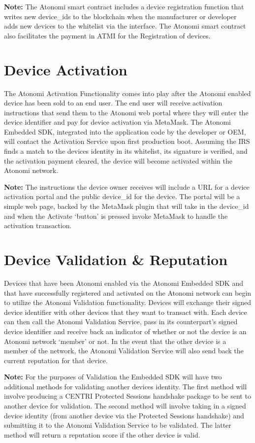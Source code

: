 \textbf{Note:} The Atonomi smart contract includes a device registration
function that writes
new device_ids to the blockchain when the manufacturer or developer adds new
devices to the whitelist via the interface. The Atonomi smart contract also
facilitates the payment in ATMI for the Registration of devices.


\section{Device Activation}
The Atonomi Activation Functionality comes into play after the Atonomi enabled
device has been sold to an end user. The end user will receive activation
instructions that send them to the Atonomi web portal where they will enter the
device identifier and pay for device activation via MetaMask. The Atonomi
Embedded SDK, integrated into the application code by the developer or OEM,
will contact the Activation Service upon first production boot. Assuming the
IRS finds a match to the devices identity in its whitelist, its signature is
verified, and the activation payment cleared, the device will become activated
within the Atonomi network.

\textbf{Note:} The instructions the device owner receives will include a URL
for a device activation portal and the public device_id for the device. The
portal will be a simple web page, backed by the MetaMask plugin that will take
in the device_id and when the Activate `button' is pressed invoke MetaMask to
handle the activation transaction.


\section{Device Validation \&{} Reputation}
Devices that have been Atonomi enabled via the Atonomi Embedded SDK and that
have successfully registered and activated on the Atonomi network can begin to
utilize the Atonomi Validation functionality. Devices will exchange their
signed device identifier with other devices that they want to transact with.
Each device can then call the Atonomi Validation Service, pass in its
counterpart's signed device identifier and receive back an indicator of
whether or not the device is an Atonomi network `member' or not. In the event
that the other device is a member of the network, the Atonomi Validation
Service will also send back the current reputation for that device.

\textbf{Note:} For the purposes of Validation the Embedded SDK will have two
additional methods for validating another devices identity. The first
method will involve producing a CENTRI Protected Sessions handshake package
to be sent to another device for validation. The second method will involve
taking in a signed device identity (from another device via the Protected
Sessions handshake) and submitting it to the Atonomi Validation Service
to be validated. The latter method will return a reputation score if the
other device is valid.



